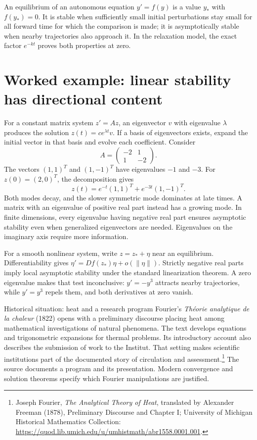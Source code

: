An equilibrium of an autonomous equation $y'=f(y)$ is a value $y_*$ with
$f(y_*)=0$. It is stable when sufficiently small initial perturbations stay
small for all forward time for which the comparison is made; it is
asymptotically stable when nearby trajectories also approach it. In the
relaxation model, the exact factor $e^{-kt}$ proves both properties at zero.

\section{Worked example: linear stability has directional content}
For a constant matrix system $z'=Az$, an eigenvector $v$ with eigenvalue
$\lambda$ produces the solution $z(t)=ce^{\lambda t}v$. If a basis of
eigenvectors exists, expand the initial vector in that basis and evolve
each coefficient. Consider
\[
 A=\begin{pmatrix}-2&1\\1&-2\end{pmatrix}.
\]
The vectors $(1,1)^T$ and $(1,-1)^T$ have eigenvalues $-1$ and $-3$.
For $z(0)=(2,0)^T$, the decomposition gives
\[
 z(t)=e^{-t}(1,1)^T+e^{-3t}(1,-1)^T.
\]
Both modes decay, and the slower symmetric mode dominates at late times.
A matrix with an eigenvalue of positive real part instead has a growing
mode. In finite dimensions, every eigenvalue having negative real part
ensures asymptotic stability even when generalized eigenvectors are needed.
Eigenvalues on the imaginary axis require more information.

For a smooth nonlinear system, write $z=z_*+\eta$ near an equilibrium.
Differentiability gives $\eta'=Df(z_*)\eta+o(\|\eta\|)$.
Strictly negative real parts imply local asymptotic stability under the
standard linearization theorem. A zero eigenvalue makes that test
inconclusive: $y'=-y^3$ attracts nearby trajectories, while $y'=y^3$
repels them, and both derivatives at zero vanish.

\begin{learningcard}[breakable=false]{Historical situation: heat and a research program}
Fourier's \emph{Th\'eorie analytique de la chaleur} (1822) opens with a
preliminary discourse placing heat among mathematical investigations of
natural phenomena. The text develops equations and trigonometric expansions
for thermal problems. Its introductory account also describes the submission
of work to the Institut. That setting makes scientific institutions part of
the documented story of circulation and assessment.\footnote{Joseph Fourier,
\emph{The Analytical Theory of Heat}, translated by Alexander Freeman
(1878), Preliminary Discourse and Chapter I; University of Michigan
Historical Mathematics Collection:
\url{https://quod.lib.umich.edu/u/umhistmath/abr1558.0001.001}.}
The source documents a program and its presentation. Modern convergence and
solution theorems specify which Fourier manipulations are justified.
\end{learningcard}

